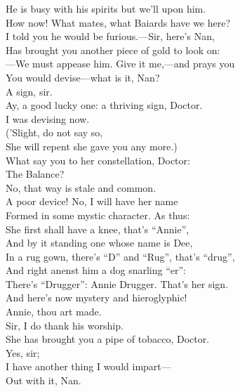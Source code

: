 \documentclass[a4paper,oneside,12pt]{memoir}
\begin{document}
\begin{drama*}
\facespeaks He is busy with his spirits but we'll upon him.\\
\subtlespeaks How now! What mates, what Baiards have we here?\\
\facespeaks I told you he would be furious.---Sir, here's Nan,\\
Has brought you another piece of gold to look on:\\
---We must appease him. Give it me,---and prays you\\
You would devise---what is it, Nan?\\
\druggerspeaks {} A sign, sir.\\
\facespeaks Ay, a good lucky one: a thriving sign, Doctor.\\
\subtlespeaks I was devising now.\\
\facespeaks {} ('Slight, do not say so,\\
She will repent she gave you any more.)\\
What say you to her constellation, Doctor:\\
The Balance?\\
\subtlespeaks {} No, that way is stale and common.\\
A poor device! No, I will have her name\\
Formed in some mystic character. As thus:\\
She first shall have a knee, that's ``Annie'',\\
And by it standing one whose name is Dee,\\
In a rug gown, there's ``D'' and ``Rug'', that's ``drug'',\\
And right anenst him a dog snarling ``er'':\\
There's ``Drugger'': Annie Drugger. That's her sign.\\
And here's now mystery and hieroglyphic!\\
\facespeaks Annie, thou art made.\\
\druggerspeaks {} Sir, I do thank his worship.\\
\facespeaks She has brought you a pipe of tobacco, Doctor.\\
\druggerspeaks {} Yes, sir;\\
I have another thing I would impart---\\
\facespeaks Out with it, Nan.\\

\end{drama*}
\end{document}
